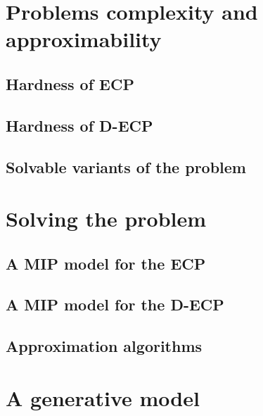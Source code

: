 \section{Problems complexity and approximability}%
\label{sec:problem_complexity_and_approximability}

\subsection{Hardness of ECP}%
\label{sub:ecp_is_}

\subsection{Hardness of D-ECP}%
\label{sub:ecp_is_}

\subsection{Solvable variants of the problem}%
\label{sub:solvable_variants_of_the_problem}

\section{Solving the problem}%
\label{sec:solving_the_problem}

\subsection{A MIP model for the ECP}%
\label{sub:a_mip_model_for_the_ecp}

\subsection{A MIP model for the D-ECP}%
\label{sub:a_mip_model_for_the_ecp}

\subsection{Approximation algorithms}%
\label{sub:approximation_algorithms}

\section{A generative model}%
\label{sec:generative_model}




